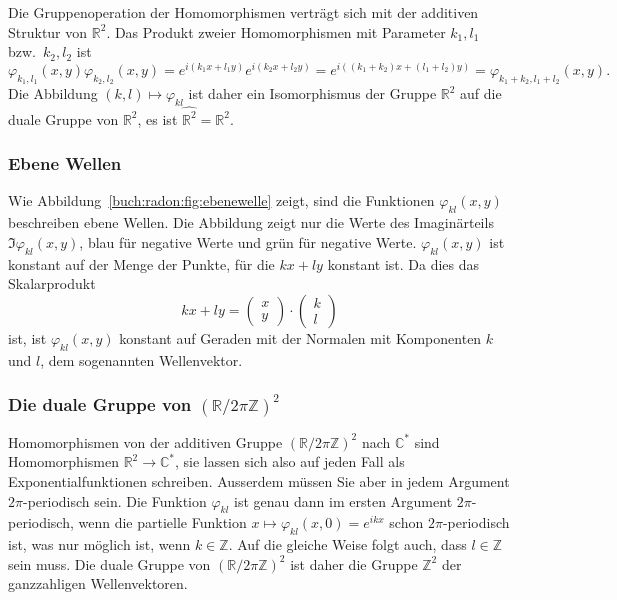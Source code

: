Die Gruppenoperation der Homomorphismen verträgt sich mit der additiven
Struktur von $\mathbb{R}^2$.
Das Produkt zweier Homomorphismen mit Parameter $k_1,l_1$ bzw.~$k_2,l_2$
ist
\[
\varphi_{k_1,l_1}(x,y)
\varphi_{k_2,l_2}(x,y)
=
e^{i(k_1x+l_1y)}
e^{i(k_2x+l_2y)}
=
e^{i((k_1+k_2)x+(l_1+l_2)y)}
=
\varphi_{k_1+k_2,l_1+l_2}(x,y).
\]
Die Abbildung $(k,l)\mapsto \varphi_{kl}$ ist daher ein Isomorphismus
der Gruppe $\mathbb{R}^2$ auf die duale Gruppe von $\mathbb{R}^2$,
es ist $\widehat{\mathbb{R}^2} = \mathbb{R}^2$.

%
%
\subsubsection{Ebene Wellen}

Wie Abbildung~\ref{buch:radon:fig:ebenewelle} zeigt, sind
die Funktionen $\varphi_{kl}(x,y)$ beschreiben ebene Wellen.
Die Abbildung zeigt nur die Werte des Imaginärteils $\Im \varphi_{kl}(x,y)$,
blau für negative Werte und grün für negative Werte.
$\varphi_{kl}(x,y)$ ist konstant auf der Menge der Punkte, für die
$kx+ly$ konstant ist.
Da dies das Skalarprodukt 
\[
kx+ly 
=
\begin{pmatrix}x\\y\end{pmatrix}
\cdot
\begin{pmatrix}k\\l\end{pmatrix}
\]
ist, ist $\varphi_{kl}(x,y)$ konstant auf Geraden mit der Normalen
mit Komponenten $k$ und $l$, dem sogenannten Wellenvektor.

%
%
\subsubsection{Die duale Gruppe von $(\mathbb{R}/2\pi\mathbb{Z})^2$}
Homomorphismen von der additiven Gruppe $(\mathbb{R}/2\pi\mathbb{Z})^2$
nach $\mathbb{C}^*$ sind Homomorphismen $\mathbb{R}^2\to\mathbb{C}^*$,
sie lassen sich also auf jeden Fall als Exponentialfunktionen schreiben.
Ausserdem müssen Sie aber in jedem Argument $2\pi$-periodisch sein.
Die Funktion $\varphi_{kl}$ ist genau dann im ersten Argument
$2\pi$-periodisch, wenn die partielle Funktion
$x\mapsto \varphi_{kl}(x,0) = e^{ikx}$ schon $2\pi$-periodisch ist,
was nur möglich ist, wenn $k\in\mathbb{Z}$.
Auf die gleiche Weise folgt auch, dass $l\in\mathbb{Z}$ sein muss.
Die duale Gruppe von $(\mathbb{R}/2\pi\mathbb{Z})^2$ ist daher
die Gruppe $\mathbb{Z}^2$ der ganzzahligen Wellenvektoren.


